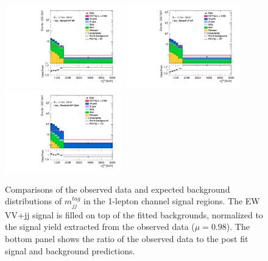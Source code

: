 \begin{figure}[]
    \centering
    \includegraphics[width=0.45\textwidth]{figures/PostFit/Region_disttagMjj_DSRVBSHP_BMin0_J0_incJet1_L1_T0_incFat1_Y6051_incTag1_Fat1_GlobalFit_unconditionnal_mu1log.pdf}
    \includegraphics[width=0.45\textwidth]{figures/PostFit/Region_disttagMjj_DSRVBSLP_BMin0_J0_incJet1_L1_T0_incFat1_Y6051_incTag1_Fat1_GlobalFit_unconditionnal_mu1log.pdf}
    \includegraphics[width=0.45\textwidth]{figures/PostFit/Region_disttagMjj_DSRVBSTight_BMin0_T0_Y6051_incTag1_J2_L1_incJet1_GlobalFit_unconditionnal_mu1log.pdf}
      \caption{Comparisons of the observed data and expected background distributions of $m^{tag}_{jj}$ in the 1-lepton channel signal regions. The EW VV+jj signal is filled on top of the fitted backgrounds, normalized to the signal yield extracted from the observed data ($\mu = 0.98$). The bottom panel shows the ratio of the observed data to the post fit signal and background predictions.}
      \label{fig:postSR1lepmtagjj}
\end{figure}
